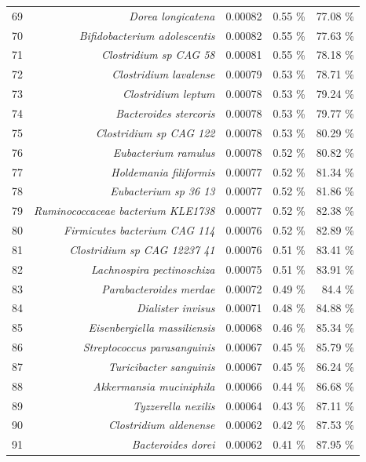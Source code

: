 \documentclass{article}
\begin{document}
\begin{table}
\begin{centering}
\begin{tabular}{|r|r|r|r|r|}
  69 & \textit{Dorea longicatena} & 0.00082 & 0.55 \% & 77.08 \% \\
  70 & \textit{Bifidobacterium adolescentis} & 0.00082 & 0.55 \% & 77.63 \% \\
  71 & \textit{Clostridium sp CAG 58} & 0.00081 & 0.55 \% & 78.18 \% \\
  72 & \textit{Clostridium lavalense} & 0.00079 & 0.53 \% & 78.71 \% \\
  73 & \textit{Clostridium leptum} & 0.00078 & 0.53 \% & 79.24 \% \\
  74 & \textit{Bacteroides stercoris} & 0.00078 & 0.53 \% & 79.77 \% \\
  75 & \textit{Clostridium sp CAG 122} & 0.00078 & 0.53 \% & 80.29 \% \\
  76 & \textit{Eubacterium ramulus} & 0.00078 & 0.52 \% & 80.82 \% \\
  77 & \textit{Holdemania filiformis} & 0.00077 & 0.52 \% & 81.34 \% \\
  78 & \textit{Eubacterium sp 36 13} & 0.00077 & 0.52 \% & 81.86 \% \\
  79 & \textit{Ruminococcaceae bacterium KLE1738} & 0.00077 & 0.52 \% & 82.38 \% \\
  80 & \textit{Firmicutes bacterium CAG 114} & 0.00076 & 0.52 \% & 82.89 \% \\
  81 & \textit{Clostridium sp CAG 12237 41} & 0.00076 & 0.51 \% & 83.41 \% \\
  82 & \textit{Lachnospira pectinoschiza} & 0.00075 & 0.51 \% & 83.91 \% \\
  83 & \textit{Parabacteroides merdae} & 0.00072 & 0.49 \% & 84.4 \% \\
  84 & \textit{Dialister invisus} & 0.00071 & 0.48 \% & 84.88 \% \\
  85 & \textit{Eisenbergiella massiliensis} & 0.00068 & 0.46 \% & 85.34 \% \\
  86 & \textit{Streptococcus parasanguinis} & 0.00067 & 0.45 \% & 85.79 \% \\
  87 & \textit{Turicibacter sanguinis} & 0.00067 & 0.45 \% & 86.24 \% \\
  88 & \textit{Akkermansia muciniphila} & 0.00066 & 0.44 \% & 86.68 \% \\
  89 & \textit{Tyzzerella nexilis} & 0.00064 & 0.43 \% & 87.11 \% \\
  90 & \textit{Clostridium aldenense} & 0.00062 & 0.42 \% & 87.53 \% \\
  91 & \textit{Bacteroides dorei} & 0.00062 & 0.41 \% & 87.95 \% \\

\end{tabular}
\end{centering}
\end{table}
\end{document}
